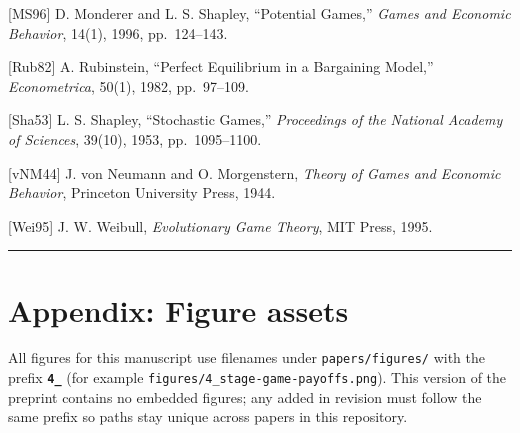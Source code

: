 \documentclass[12pt]{article}
\begin{document}
{[}MS96{]} D. Monderer and L. S. Shapley, ``Potential Games,''
\emph{Games and Economic Behavior}, 14(1), 1996, pp.~124--143.

{[}Rub82{]} A. Rubinstein, ``Perfect Equilibrium in a Bargaining
Model,'' \emph{Econometrica}, 50(1), 1982, pp.~97--109.

{[}Sha53{]} L. S. Shapley, ``Stochastic Games,'' \emph{Proceedings of
the National Academy of Sciences}, 39(10), 1953, pp.~1095--1100.

{[}vNM44{]} J. von Neumann and O. Morgenstern, \emph{Theory of Games and
Economic Behavior}, Princeton University Press, 1944.

{[}Wei95{]} J. W. Weibull, \emph{Evolutionary Game Theory}, MIT Press,
1995.

\begin{center}\rule{0.5\linewidth}{0.5pt}\end{center}

\section{Appendix: Figure assets}\label{appendix-figure-assets}

All figures for this manuscript use filenames under
\texttt{papers/figures/} with the prefix \textbf{\texttt{4\_}} (for
example \texttt{figures/4\_stage-game-payoffs.png}). This version of the
preprint contains no embedded figures; any added in revision must follow
the same prefix so paths stay unique across papers in this repository.
\end{document}
